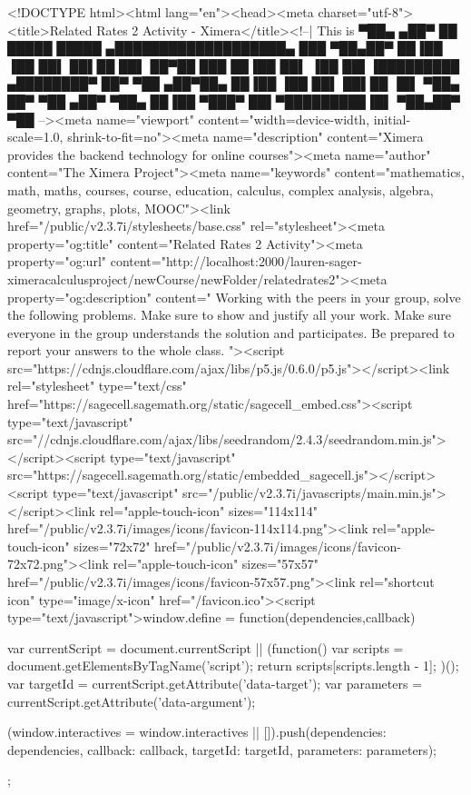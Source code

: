 
<!DOCTYPE html><html lang="en"><head><meta charset="utf-8"><title>Related Rates 2 Activity - Ximera</title><!--| This is 
▀██▄   ▄██▀ ██ █████     █████ ▄███████████████████▄    ███
  ▀██▄██▀   ██▐██ ▐██   ██▌ ██▌██                 ██▌  ██▀██
    ███     ██▐██  ██▌ ▐██  ██▌▐█████████ ▄████████▀  ██▀ ▀██
  ▄██▀██▄   ██▐██  ▐██ ██▌  ██▌██        ▐█▌  ▀██▄   ██▀   ▀██
▄██▀   ▀██▄ ██▐██   ▀███▀   ██▌▀█████████▐█▌    ▀██▄██▀     ▀██
--><meta name="viewport" content="width=device-width, initial-scale=1.0, shrink-to-fit=no"><meta name="description" content="Ximera provides the backend technology for online courses"><meta name="author" content="The Ximera Project"><meta name="keywords" content="mathematics, math, maths, courses, course, education, calculus, complex analysis, algebra, geometry, graphs, plots, MOOC"><link href="/public/v2.3.7i/stylesheets/base.css" rel="stylesheet"><meta property="og:title" content="Related Rates 2 Activity"><meta property="og:url" content="http://localhost:2000/lauren-sager-ximeracalculusproject/newCourse/newFolder/relatedrates2"><meta property="og:description" content="
Working with the peers in your group, solve the following problems. Make sure to
show and justify all your work. Make sure everyone in the group understands the
solution and participates. Be prepared to report your answers to the whole
class. 
"><script src="https://cdnjs.cloudflare.com/ajax/libs/p5.js/0.6.0/p5.js"></script><link rel="stylesheet" type="text/css" href="https://sagecell.sagemath.org/static/sagecell_embed.css"><script type="text/javascript" src="//cdnjs.cloudflare.com/ajax/libs/seedrandom/2.4.3/seedrandom.min.js"></script><script type="text/javascript" src="https://sagecell.sagemath.org/static/embedded_sagecell.js"></script><script type="text/javascript" src="/public/v2.3.7i/javascripts/main.min.js"></script><link rel="apple-touch-icon" sizes="114x114" href="/public/v2.3.7i/images/icons/favicon-114x114.png"><link rel="apple-touch-icon" sizes="72x72" href="/public/v2.3.7i/images/icons/favicon-72x72.png"><link rel="apple-touch-icon" sizes="57x57" href="/public/v2.3.7i/images/icons/favicon-57x57.png"><link rel="shortcut icon" type="image/x-icon" href="/favicon.ico"><script type="text/javascript">window.define = function(dependencies,callback) {
  var currentScript = document.currentScript || (function() {
    var scripts = document.getElementsByTagName('script');
    return scripts[scripts.length - 1];
  })();
  var targetId = currentScript.getAttribute('data-target');
  var parameters = currentScript.getAttribute('data-argument');

  (window.interactives = window.interactives || []).push({dependencies: dependencies, callback: callback, targetId: targetId, parameters: parameters});
};
